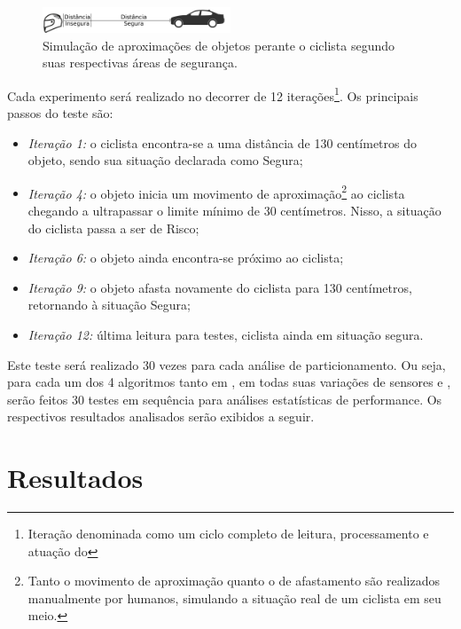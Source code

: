         \begin{figure}[h] \centering
            \includegraphics[width=0.5\textwidth]{img/distance.png}
            \caption{Simulação de aproximações de objetos perante o ciclista segundo suas respectivas áreas de segurança.}
            \label{fig:distance}
        \end{figure}
    
        Cada experimento será realizado no decorrer de 12 iterações\footnote{Iteração denominada como um ciclo completo de leitura, processamento e atuação do \wearable}. 
        Os principais passos do teste são:
        \begin{itemize}
            \item 
            \textit{Iteração 1:} o ciclista encontra-se a uma distância de 130 centímetros do objeto, sendo sua situação declarada como Segura;
            \item 
            \textit{Iteração 4:} o objeto inicia um movimento de aproximação\footnote{Tanto o movimento de aproximação quanto o de afastamento são realizados manualmente por humanos, simulando a situação real de um ciclista em seu meio.} ao ciclista chegando a ultrapassar o limite mínimo de 30 centímetros. Nisso, a situação do ciclista passa a ser de Risco;
            \item
            \textit{Iteração 6:} o objeto ainda encontra-se próximo ao ciclista;
            \item 
            \textit{Iteração 9:} o objeto afasta novamente do ciclista para 130 centímetros, retornando à situação Segura;
            \item 
            \textit{Iteração 12:} última leitura para testes, ciclista ainda em situação segura.
        \end{itemize}
   
        Este teste será realizado 30 vezes para cada análise de particionamento. 
        Ou seja, para cada um dos 4 algoritmos tanto em \hs, em todas suas variações de sensores e \buffer, serão feitos 30 testes em sequência para análises estatísticas de performance.
        Os respectivos resultados analisados serão exibidos a seguir.


\section{Resultados}
